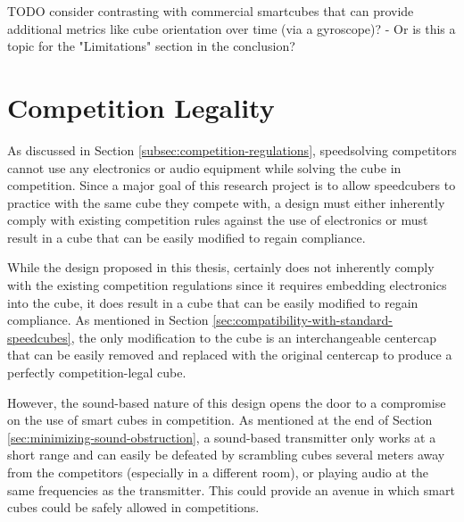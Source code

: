TODO consider contrasting with commercial smartcubes that can provide
additional metrics like cube orientation over time (via a gyroscope)?
- Or is this a topic for the "Limitations" section in the conclusion?


\section{Competition Legality}
\label{sec:competition-legality}

As discussed in Section \ref{subsec:competition-regulations},
speedsolving competitors cannot use any electronics or audio equipment
while solving the cube in competition. Since a major goal of this
research project is to allow speedcubers to practice with the same cube
they compete with, a design must either inherently comply with existing
competition rules against the use of electronics or must result in a
cube that can be easily modified to regain compliance.

While the design proposed in this thesis, certainly does not inherently
comply with the existing competition regulations since it requires
embedding electronics into the cube, it does result in a cube that can
be easily modified to regain compliance. As mentioned in Section
\ref{sec:compatibility-with-standard-speedcubes}, the only modification
to the cube is an interchangeable centercap that can be easily removed
and replaced with the original centercap to produce a perfectly
competition-legal cube.

However, the sound-based nature of this design opens the door to a
compromise on the use of smart cubes in competition. As mentioned at
the end of Section \ref{sec:minimizing-sound-obstruction}, a
sound-based transmitter only works at a short range and can easily be
defeated by scrambling cubes several meters away from the competitors
(especially in a different room), or playing audio at the same
frequencies as the transmitter. This could provide an avenue in which
smart cubes could be safely allowed in competitions.

